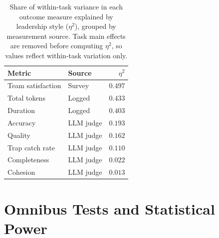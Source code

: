 \begin{table}[htbp]
  \centering
  \small
  \caption{Share of within-task variance in each outcome measure explained by leadership style ($\eta^2$), grouped by measurement source. Task main effects are removed before computing $\eta^2$, so values reflect within-task variation only.}
  \label{tab:02-judge-eta-squared}
\begin{tabular}{>{\raggedright\arraybackslash}p{5cm} >{\raggedright\arraybackslash}p{3.5cm} r}
    \toprule
    Metric & Source & $\eta^2$ \\
    \midrule
    Team satisfaction & Survey & $0.497$ \\
    Total tokens & Logged & $0.433$ \\
    Duration & Logged & $0.403$ \\
    Accuracy & LLM judge & $0.193$ \\
    Quality & LLM judge & $0.162$ \\
    Trap catch rate & LLM judge & $0.110$ \\
    Completeness & LLM judge & $0.022$ \\
    Cohesion & LLM judge & $0.013$ \\
    \bottomrule
\end{tabular}%
\end{table}

\clearpage
\section{Omnibus Tests and Statistical Power}

